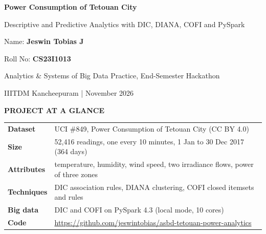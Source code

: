 \documentclass[11pt,a4paper]{article}
\begin{document}
\hypersetup{pageanchor=false}
\begin{titlepage}
\centering
\vspace*{\fill}
{\Huge\bfseries\color{accent} Power Consumption of Tetouan City\par}
\vspace{0.4cm}
{\Large Descriptive and Predictive Analytics with DIC, DIANA, COFI and PySpark\par}
\vspace{1.4cm}
{\large Name: \textbf{Jeswin Tobias J}\par}
\vspace{2pt}
{\large Roll No: \textbf{CS23I1013}\par}
\vspace{0.8cm}
{\large Analytics \& Systems of Big Data Practice, End-Semester Hackathon\par}
{\large IIITDM Kancheepuram \quad| November 2026\par}
\vspace{1.4cm}
\colorbox{boxbg}{\parbox{\dimexpr\textwidth-2\fboxsep}{\vspace{6pt}\centering
{\small\bfseries\color{accent} PROJECT AT A GLANCE}\par\vspace{6pt}
\small
\begin{tabularx}{0.92\linewidth}{@{}>{\bfseries}p{2.1cm}Y@{}}
Dataset & UCI \#849, Power Consumption of Tetouan City (CC BY 4.0)\\[3pt]
Size & 52,416 readings, one every 10 minutes, 1 Jan to 30 Dec 2017 (364 days)\\[3pt]
Attributes & temperature, humidity, wind speed, two irradiance flows, power of three zones\\[3pt]
Techniques & DIC association rules, DIANA clustering, COFI closed itemsets and rules\\[3pt]
Big data & DIC and COFI on PySpark 4.3 (local mode, 10 cores)\\[3pt]
Code & \url{https://github.com/jeswintobias/asbd-tetouan-power-analytics}\\
\end{tabularx}\vspace{4pt}}}
\vspace*{\fill}
\end{titlepage}
\hypersetup{pageanchor=true}

\tableofcontents
\vspace{1em}
\end{document}
